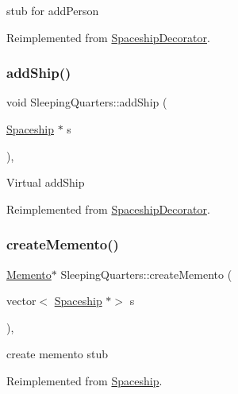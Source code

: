 stub for add\+Person 

Reimplemented from \hyperlink{classSpaceshipDecorator_a6e289d8a65f35b9f223255ae0eaa3b00}{Spaceship\+Decorator}.

\mbox{\label{classSleepingQuarters_ae15ba2bf6be5cc0d4580da9ecbbe28f5}} 
\subsubsection{\texorpdfstring{add\+Ship()}{addShip()}}
{\footnotesize\ttfamily void Sleeping\+Quarters\+::add\+Ship (\begin{DoxyParamCaption}\item[{\hyperlink{classSpaceship}{Spaceship} $\ast$}]{s }\end{DoxyParamCaption})\hspace{0.3cm}{\ttfamily [inline]}, {\ttfamily [virtual]}}

Virtual add\+Ship 

Reimplemented from \hyperlink{classSpaceshipDecorator_a5ed39419f5fab65dd4af11bf5136f7a4}{Spaceship\+Decorator}.

\mbox{\label{classSleepingQuarters_ac71f6fb8b3ec0be83be6cd3c080fecc0}} 
\subsubsection{\texorpdfstring{create\+Memento()}{createMemento()}}
{\footnotesize\ttfamily \hyperlink{classMemento}{Memento}$\ast$ Sleeping\+Quarters\+::create\+Memento (\begin{DoxyParamCaption}\item[{vector$<$ \hyperlink{classSpaceship}{Spaceship} $\ast$$>$}]{s }\end{DoxyParamCaption})\hspace{0.3cm}{\ttfamily [inline]}, {\ttfamily [virtual]}}

create memento stub 

Reimplemented from \hyperlink{classSpaceship_a6d272f846b019dec8226ddab65648a7b}{Spaceship}.

\mbox{\label{classSleepingQuarters_aa914af0350fa1a9ac5ebb7509d28b758}} 
